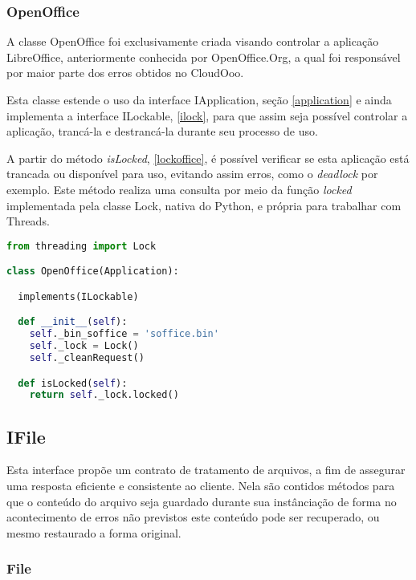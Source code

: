 \subsubsection{OpenOffice}
\label{ooffice}


A classe OpenOffice foi exclusivamente criada visando controlar a aplicação LibreOffice, anteriormente conhecida por OpenOffice.Org, a qual foi responsável por maior parte dos erros obtidos no CloudOoo. 

Esta classe estende o uso da interface IApplication, seção \ref{application} e ainda implementa a interface ILockable, \ref{ilock}, para que assim seja possível controlar a aplicação, trancá-la e destrancá-la durante seu processo de uso.

A partir do método \textit{isLocked}, \ref{lockoffice}, é possível verificar se esta aplicação está trancada ou disponível para uso, evitando assim erros, como o \textit{deadlock} por exemplo. Este método realiza uma consulta por meio da função \textit{locked} implementada pela classe Lock, nativa do Python, e própria para trabalhar com Threads.

{\singlespace
\begin{lstlisting}[caption=Trecho isLocked da classe OpenOffice,language=python,label={lockoffice}]
from threading import Lock

class OpenOffice(Application):

  implements(ILockable)

  def __init__(self):
    self._bin_soffice = 'soffice.bin'
    self._lock = Lock()
    self._cleanRequest()

  def isLocked(self):
    return self._lock.locked()
\end{lstlisting}
}


\subsection{IFile}
\label{ifile}

Esta interface propõe um contrato de tratamento de arquivos, a fim de assegurar uma resposta eficiente e consistente ao cliente. Nela são contidos métodos para que o conteúdo do arquivo seja guardado durante sua instânciação de forma no acontecimento de erros não previstos este conteúdo pode ser recuperado, ou mesmo restaurado a forma original.


\subsubsection{File}
\label{file}

